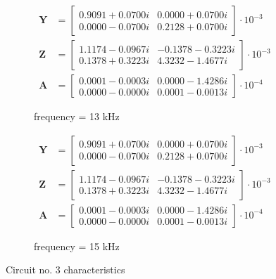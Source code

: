 \documentclass[notitlepage, a4paper, 11pt]{article}
\begin{document}
	\begin{figure}[H]
		\begin{subfigure}{0.45\textwidth}
			\begin{align*}
				\mathbf{Y} &= 
				\begin{bmatrix}
					0.9091 + 0.0700i  & 0.0000 + 0.0700i \\
					0.0000 - 0.0700i  & 0.2128 + 0.0700i
				\end{bmatrix}
				\cdot 10^{-3}
				\\
				\mathbf{Z} &= 
				\begin{bmatrix}
					1.1174 - 0.0967i & -0.1378 - 0.3223i \\
					0.1378 + 0.3223i & 4.3232 - 1.4677i
				\end{bmatrix}
				\cdot 10^{-3}
				\\
				\mathbf{A} &= 
				\begin{bmatrix}
					0.0001 - 0.0003i & 0.0000 - 1.4286i \\
					0.0000 - 0.0000i & 0.0001 - 0.0013i
				\end{bmatrix}
				\cdot 10^{-4}
			\end{align*}
			\caption{frequency = 13 kHz}
		\end{subfigure}
		\hfill
		\begin{subfigure}{0.45\textwidth}
			\begin{align*}
				\mathbf{Y} &= 
				\begin{bmatrix}
					0.9091 + 0.0700i  & 0.0000 + 0.0700i \\
					0.0000 - 0.0700i  & 0.2128 + 0.0700i
				\end{bmatrix}
				\cdot 10^{-3}
				\\
				\mathbf{Z} &= 
				\begin{bmatrix}
					1.1174 - 0.0967i & -0.1378 - 0.3223i \\
					0.1378 + 0.3223i & 4.3232 - 1.4677i
				\end{bmatrix}
				\cdot 10^{-3}
				\\
				\mathbf{A} &= 
				\begin{bmatrix}
					0.0001 - 0.0003i & 0.0000 - 1.4286i \\
					0.0000 - 0.0000i & 0.0001 - 0.0013i
				\end{bmatrix}
				\cdot 10^{-4}
			\end{align*}
			\caption{frequency = 15 kHz}
		\end{subfigure}
		\caption{Circuit no. 3 characteristics}
	\end{figure}
	
\end{document}
